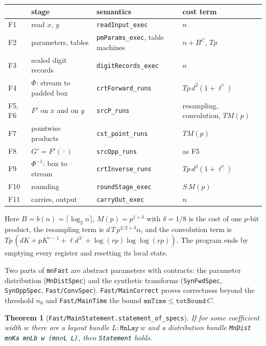 \documentclass[11pt]{amsart}
\newtheorem{theorem}{Theorem}
\theoremstyle{remark}
\begin{document}
\begin{center}\small
\begin{tabular}{@{}llll@{}}
\toprule
& stage & semantics & cost term\\
\midrule
F1 & read $x$, $y$ & \texttt{readInput\_exec} & $n$\\
F2 & parameters, tables & \texttt{pmParams\_exec}, table machines & $n+B^C$, $Tp$\\
F3 & scaled digit records & \texttt{digitRecords\_exec} & $n$\\
F4 & $\Phi$: stream to padded box & \texttt{crtForward\_runs} & $Tp\,d^2(1+\ell^\tau)$\\
F5, F6 & $F'$ on $x$ and on $y$ & \texttt{srcP\_runs} & resampling, convolution, $TM(p)$\\
F7 & pointwise products & \texttt{cst\_point\_runs} & $TM(p)$\\
F8 & $G'=\overline{F'(\bar\cdot)}$ & \texttt{srcOpp\_runs} & as F5\\
F9 & $\Phi^{-1}$: box to stream & \texttt{crtInverse\_runs} & $Tp\,d^2(1+\ell^\tau)$\\
F10 & rounding & \texttt{roundStage\_exec} & $S\,M(p)$\\
F11 & carries, output & \texttt{carryOut\_exec} & $n$\\
\bottomrule
\end{tabular}
\end{center}

Here $B=b(n)=\lceil\log_2n\rceil$, $M(p)=p^{1+\delta}$ with $\delta=1/8$ is the cost of one
$p$-bit product, the resampling term is $d\,T\,p^{3/2+\delta}\alpha$, and the convolution term
is $Tp\,(dK+pK^{\tau-1}+\ell d^{\lambda'}+\log(rp)\log\log(rp))$. The program ends by emptying
every register and resetting its local state.

Two parts of \texttt{mnFast} are abstract parameters with contracts: the parameter
distribution (\texttt{MnDistSpec}) and the synthetic transforms (\texttt{SynFwdSpec},
\texttt{SynOppSpec}, \texttt{Fast/ConvSpec}). \texttt{Fast/MainCorrect} proves correctness beyond
the threshold $n_0$ and \texttt{Fast/MainTime} the bound $\texttt{mnTime}\le\texttt{totBound}\,C$.

\begin{theorem}[\texttt{Fast/MainStatement.statement\_of\_specs}]
If for some coefficient width $w$ there are a layout bundle $L:\texttt{MnLay}\ w$ and a
distribution bundle \texttt{MnDist mnKa mnLb w (mn$\sigma$L L)}, then \texttt{Statement} holds.
\end{theorem}
\end{document}
